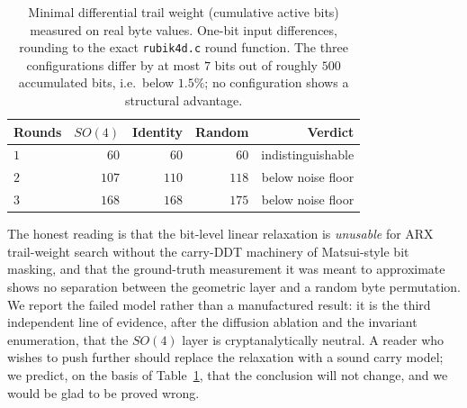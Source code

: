 \documentclass[review,12pt]{elsarticle}
\begin{document}
\begin{table}[htbp]
\centering
\caption{Minimal differential trail weight (cumulative active bits) measured on real byte values. One-bit input differences, rounding to the exact \texttt{rubik4d.c} round function. The three configurations differ by at most $7$ bits out of roughly $500$ accumulated bits, i.e.\ below $1.5\%$; no configuration shows a structural advantage.}
\label{tab:trail_weight}
\small
\begin{tabular}{@{}lrrrr@{}}
\toprule
Rounds & $SO(4)$ & Identity & Random & Verdict \\
\midrule
$1$ & $60$ & $60$ & $60$ & indistinguishable \\
$2$ & $107$ & $110$ & $118$ & below noise floor \\
$3$ & $168$ & $168$ & $175$ & below noise floor \\
\bottomrule
\end{tabular}
\end{table}

The honest reading is that the bit-level linear relaxation is \emph{unusable} for ARX trail-weight search without the carry-DDT machinery of Matsui-style bit masking, and that the ground-truth measurement it was meant to approximate shows no separation between the geometric layer and a random byte permutation. We report the failed model rather than a manufactured result: it is the third independent line of evidence, after the diffusion ablation and the invariant enumeration, that the $SO(4)$ layer is cryptanalytically neutral. A reader who wishes to push further should replace the relaxation with a sound carry model; we predict, on the basis of Table~\ref{tab:trail_weight}, that the conclusion will not change, and we would be glad to be proved wrong.
\end{document}
